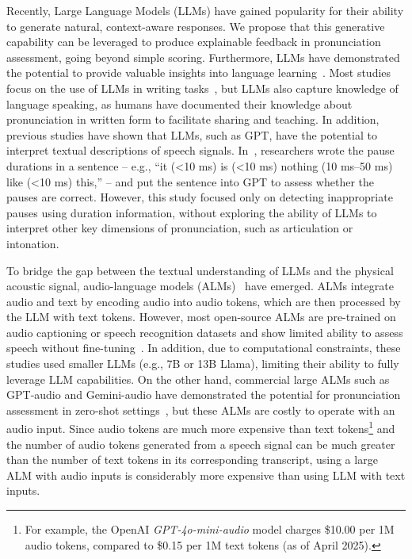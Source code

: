 \documentclass[11pt]{article}
\begin{document}
Recently, Large Language Models (LLMs) have gained popularity for their ability to generate natural, context-aware responses. We propose that this generative capability can be leveraged to produce explainable feedback in pronunciation assessment, going beyond simple scoring. Furthermore, LLMs have demonstrated the potential to provide valuable insights into language learning~\cite{c2023impact}. Most studies focus on the use of LLMs in writing tasks~\cite{lo2024exploring}, but LLMs also capture knowledge of language speaking, as humans have documented their knowledge about pronunciation in written form to facilitate sharing and teaching. In addition, previous studies have shown that LLMs, such as GPT, have the potential to interpret textual descriptions of speech signals. In~\cite{wang2023assessing}, researchers wrote the pause durations in a sentence -- e.g., “it (\textless 10 ms) is (\textless 10 ms) nothing (10 ms–50 ms) like (\textless 10 ms) this,” -- and put the sentence into GPT to assess whether the pauses are correct. However, this study focused only on detecting inappropriate pauses using duration information, without exploring the ability of LLMs to interpret other key dimensions of pronunciation, such as articulation or intonation.

To bridge the gap between the textual understanding of LLMs and the physical acoustic signal, audio-language models (ALMs)~\cite{elizalde2023clap, tang2023salmonn, chu2023qwen} have emerged. ALMs integrate audio and text by encoding audio into audio tokens, which are then processed by the LLM with text tokens. However, most open-source ALMs are pre-trained on audio captioning or speech recognition datasets and show limited ability to assess speech without fine-tuning~\cite{deshmukh2024pam, wang2025enabling}. In addition, due to computational constraints, these studies used smaller LLMs (e.g., 7B or 13B Llama), limiting their ability to fully leverage LLM capabilities. On the other hand, commercial large ALMs such as GPT-audio and Gemini-audio have demonstrated the potential for pronunciation assessment in zero-shot settings~\cite{wang2025exploring}, but these ALMs are costly to operate with an audio input. Since audio tokens are much more expensive than text tokens\footnote{For example, the OpenAI \textit{GPT-4o-mini-audio} model charges \$10.00 per 1M audio tokens, compared to \$0.15 per 1M text tokens (as of April 2025).} and the number of audio tokens generated from a speech signal can be much greater than the number of text tokens in its corresponding transcript, using a large ALM with audio inputs is considerably more expensive than using LLM with text inputs.
\end{document}
